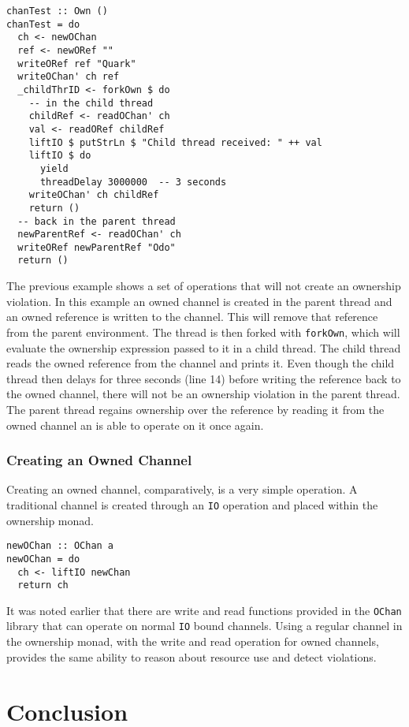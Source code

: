 \documentclass[onehalf,11pt]{beavtex}
\begin{document}
\begin{lstlisting}
chanTest :: Own ()
chanTest = do
  ch <- newOChan
  ref <- newORef ""
  writeORef ref "Quark"
  writeOChan' ch ref
  _childThrID <- forkOwn $ do
    -- in the child thread
    childRef <- readOChan' ch
    val <- readORef childRef
    liftIO $ putStrLn $ "Child thread received: " ++ val
    liftIO $ do 
      yield
      threadDelay 3000000  -- 3 seconds
    writeOChan' ch childRef
    return ()
  -- back in the parent thread
  newParentRef <- readOChan' ch
  writeORef newParentRef "Odo"
  return ()
\end{lstlisting}

The previous example shows a set of operations that will not create an ownership
violation. In this example an owned channel is created in the parent thread and
an owned reference is written to the channel.
This will remove that reference from the parent environment.
The thread is then forked with \texttt{forkOwn}, which will evaluate the
ownership expression passed to it in a child thread.
The child thread reads the owned reference from the channel and prints it.
Even though the child thread then delays for three seconds (line 14) before
writing the reference back to the owned channel, there will not be an ownership
violation in the parent thread.
The parent thread regains ownership over the reference by reading it from the
owned channel an is able to operate on it once again.

\subsection{Creating an Owned Channel}

Creating an owned channel, comparatively, is a very simple operation.
A traditional channel is created through an \texttt{IO} operation and placed
within the ownership monad.

\begin{verbatim}
newOChan :: OChan a
newOChan = do
  ch <- liftIO newChan
  return ch
\end{verbatim}

It was noted earlier that there are write and read functions provided
in the \texttt{OChan} library that can operate on normal \texttt{IO} bound
channels.  Using a regular channel in the ownership monad,
with the write and read operation for owned channels,
provides the same ability to reason about resource use and detect violations.


\chapter{Conclusion}
\end{document}
